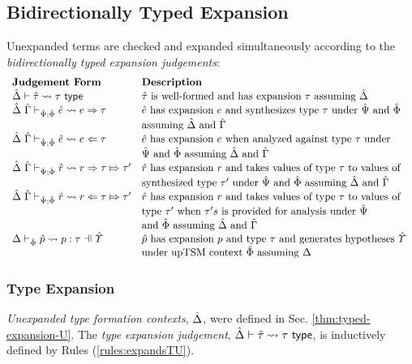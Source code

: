 \subsection{Bidirectionally Typed Expansion}
Unexpanded terms are checked and expanded simultaneously according to the \emph{bidirectionally typed expansion judgements}:
\[\begin{array}{ll}
\textbf{Judgement Form} & \textbf{Description}\\
\expandsTU{\uDelta}{\utau}{\tau} & \text{$\utau$ is well-formed and has expansion $\tau$ assuming $\uDelta$}\\
\esyn{\uDelta}{\uGamma}{\uPsi}{\uPhi}{\ue}{e}{\tau} & \text{$\ue$ has expansion $e$ and synthesizes type $\tau$ under $\uPsi$ and $\uPhi$}\\
& \text{assuming $\uDelta$ and $\uGamma$}\\
\eana{\uDelta}{\uGamma}{\uPsi}{\uPhi}{\ue}{e}{\tau} & \text{$\ue$ has expansion $e$ when analyzed against type $\tau$ under}\\
& \text{$\uPsi$ and $\uPhi$ assuming $\uDelta$ and $\uGamma$}\\
\rsyn{\uDelta}{\uGamma}{\uPsi}{\uPhi}{\urv}{r}{\tau}{\tau'} & \text{$\urv$ has expansion $r$ and takes values of type $\tau$ to values of}\\
& \text{synthesized type $\tau'$ under $\uPsi$ and $\uPhi$ assuming $\uDelta$ and $\uGamma$}\\
\rana{\uDelta}{\uGamma}{\uPsi}{\uPhi}{\urv}{r}{\tau}{\tau'} & \text{$\urv$ has expansion $r$ and takes values of type $\tau$ to values of}\\
& \text{type $\tau'$ when $\tau's$ is provided for analysis under $\uPsi$}\\
& \text{and $\uPhi$ assuming $\uDelta$ and $\uGamma$}\\
\patExpands{\upctx}{\uPhi}{\upv}{p}{\tau} & \text{$\upv$ has expansion $p$ and type $\tau$ and generates hypotheses $\upctx$ }\\
& \text{under upTSM context $\uPhi$ assuming $\Delta$}
\end{array}\]

\subsubsection{Type Expansion}
\emph{Unexpanded type formation contexts}, $\hat{\Delta}$, were defined in Sec. \ref{thm:typed-expansion-U}. The \emph{type expansion judgement}, $\hat{\Delta} \vdash {\hat\tau} \leadsto \tau~\mathsf{type}$, is inductively defined by Rules (\ref{rules:expandsTU}).

